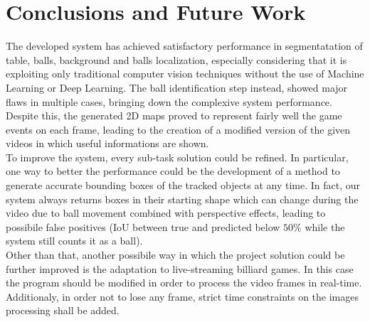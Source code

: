 \section{Conclusions and Future Work}


The developed system has achieved satisfactory performance in segmentatation of table, balls, background and balls localization, especially considering 
that it is exploiting only traditional computer vision techniques without the use of Machine Learning or Deep Learning.
The ball identification step instead, showed major flaws in multiple cases, bringing down the complexive system performance. 
Despite this, the generated 2D maps proved to represent fairly well the game events on each frame, leading to the creation of a modified version
of the given videos in which useful informations are shown. 
\newline \\
To improve the system, every sub-task solution could be refined.
In particular, one way to better the performance could be the development of a method to generate accurate bounding boxes
of the tracked objects at any time. In fact, our system always returns boxes in their starting shape which can change during the video due to ball
movement combined with perspective effects, leading to possibile false positives (IoU between true and predicted below $50\%$ while the system still 
counts it as a ball).
\newline \\
Other than that, another possibile way in which the project solution could be further improved is the adaptation to live-streaming billiard games. In this case the program should be modified
in order to process the video frames in real-time. Additionaly, in order not to lose any frame, strict time constraints on the images processing shall be added. 
